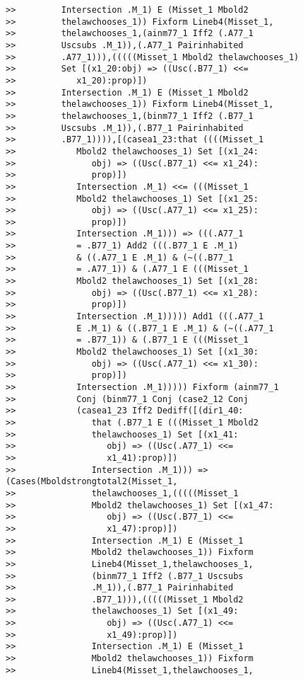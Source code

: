 \documentclass[12pt]{article}
\begin{document}
\begin{verbatim}
>>         Intersection .M_1) E (Misset_1 Mbold2
>>         thelawchooses_1)) Fixform Lineb4(Misset_1,
>>         thelawchooses_1,(ainm77_1 Iff2 (.A77_1
>>         Uscsubs .M_1)),(.A77_1 Pairinhabited
>>         .A77_1))),(((((Misset_1 Mbold2 thelawchooses_1)
>>         Set [(x1_20:obj) => ((Usc(.B77_1) <<=
>>            x1_20):prop)])
>>         Intersection .M_1) E (Misset_1 Mbold2
>>         thelawchooses_1)) Fixform Lineb4(Misset_1,
>>         thelawchooses_1,(binm77_1 Iff2 (.B77_1
>>         Uscsubs .M_1)),(.B77_1 Pairinhabited
>>         .B77_1)))),[(casea1_23:that ((((Misset_1
>>            Mbold2 thelawchooses_1) Set [(x1_24:
>>               obj) => ((Usc(.B77_1) <<= x1_24):
>>               prop)])
>>            Intersection .M_1) <<= (((Misset_1
>>            Mbold2 thelawchooses_1) Set [(x1_25:
>>               obj) => ((Usc(.A77_1) <<= x1_25):
>>               prop)])
>>            Intersection .M_1))) => (((.A77_1
>>            = .B77_1) Add2 (((.B77_1 E .M_1)
>>            & ((.A77_1 E .M_1) & (~((.B77_1
>>            = .A77_1)) & (.A77_1 E (((Misset_1
>>            Mbold2 thelawchooses_1) Set [(x1_28:
>>               obj) => ((Usc(.B77_1) <<= x1_28):
>>               prop)])
>>            Intersection .M_1))))) Add1 (((.A77_1
>>            E .M_1) & ((.B77_1 E .M_1) & (~((.A77_1
>>            = .B77_1)) & (.B77_1 E (((Misset_1
>>            Mbold2 thelawchooses_1) Set [(x1_30:
>>               obj) => ((Usc(.A77_1) <<= x1_30):
>>               prop)])
>>            Intersection .M_1))))) Fixform (ainm77_1
>>            Conj (binm77_1 Conj (case2_12 Conj
>>            (casea1_23 Iff2 Dediff([(dir1_40:
>>               that (.B77_1 E (((Misset_1 Mbold2
>>               thelawchooses_1) Set [(x1_41:
>>                  obj) => ((Usc(.A77_1) <<=
>>                  x1_41):prop)])
>>               Intersection .M_1))) => (Cases(Mboldstrongtotal2(Misset_1,
>>               thelawchooses_1,(((((Misset_1
>>               Mbold2 thelawchooses_1) Set [(x1_47:
>>                  obj) => ((Usc(.B77_1) <<=
>>                  x1_47):prop)])
>>               Intersection .M_1) E (Misset_1
>>               Mbold2 thelawchooses_1)) Fixform
>>               Lineb4(Misset_1,thelawchooses_1,
>>               (binm77_1 Iff2 (.B77_1 Uscsubs
>>               .M_1)),(.B77_1 Pairinhabited
>>               .B77_1))),(((((Misset_1 Mbold2
>>               thelawchooses_1) Set [(x1_49:
>>                  obj) => ((Usc(.A77_1) <<=
>>                  x1_49):prop)])
>>               Intersection .M_1) E (Misset_1
>>               Mbold2 thelawchooses_1)) Fixform
>>               Lineb4(Misset_1,thelawchooses_1,

\end{verbatim}
\end{document}
